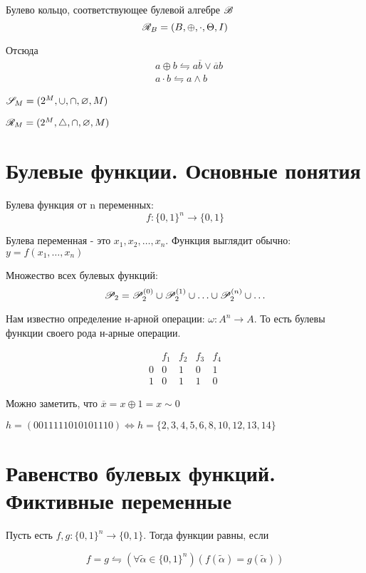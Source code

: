 Булево кольцо, соответствующее булевой алгебре $\mathscr{B}$ 
\[
    \mathscr{R}_{B} = (B, \oplus, \cdot,\Theta, I)
\] 

Отсюда
\begin{align*}
    &a \oplus b \leftrightharpoons a \overline{b} \lor \overline{a}b\\
    &a\cdot b \leftrightharpoons a \land b
\end{align*}   


$\mathscr{S}_M = (2^{M}, \cup, \cap, \varnothing, M)$ 

$\mathscr{R}_M = (2^{M}, \triangle, \cap, \varnothing, M)$

\section{Булевые функции. Основные понятия}

\begin{definition}
Булева функция от n переменных:
\[
f: \{0,1\}^{n} \to \{0,1\}  
\] 
\end{definition}

Булева переменная - это $x_1,x_2,\ldots,x_{n}$. Функция выглядит обычно:
$y = f(x_1,\ldots,x_{n})$

\medskip

Множество всех булевых функций:
\[
\mathscr{P}_2 = \mathscr{P}_2^{(0)} \cup \mathscr{P}_2^{(1)} \cup \ldots \cup \mathscr{P}_2^{(n)} \cup \ldots
\] 

Нам известно определение н-арной операции: $\omega: A^{n} \to A$. То есть булевы функции
своего рода н-арные операции.

$$
\begin{matrix}
    & f_1 & f_2 & f_3 & f_4\\
    0 & 0 & 1 & 0 & 1\\
    1 & 0 & 1 & 1 & 0
\end{matrix}
$$

Можно заметить, что $\overline{x} = x \oplus 1 = x \sim 0$

\medskip

$h = (0011 1110 1010 1110) \Longleftrightarrow h = \{2,3,4,5,6,8,10,12,13,14\} $


\section{Равенство булевых функций. Фиктивные переменные}

\begin{definition}
Пусть есть $f,g: \{0,1\}^{n} \to \{0,1\}$. Тогда функции равны, если

\[
    f = g \leftrightharpoons (\forall \widetilde{\alpha} \in \{0,1\}^{n})(f(\widetilde{\alpha})
    = g (\widetilde{\alpha}))
\] 
\end{definition}

